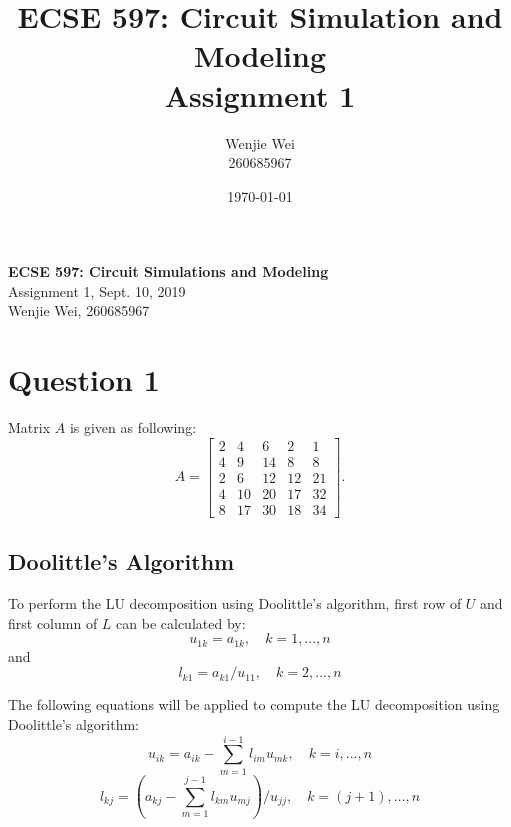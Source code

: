 \documentclass[a4paper,titlepage]{article}
\title{\textbf{ECSE 597: Circuit Simulation and Modeling} \\ Assignment 1}
\author{Wenjie Wei \\ 260685967}
\date{\today}
\begin{document}
	\sloppy	
	
	\begin{center}
		{\LARGE \bf ECSE 597: Circuit Simulations and Modeling}\\
		{\large Assignment 1, Sept. 10, 2019}\\
		{Wenjie Wei, 260685967}
	\end{center}
	
	\section{Question 1}
		Matrix $A$ is given as following:
		$$
			A = \begin{bmatrix}
				2 & 4 & 6 & 2 & 1\\
				4 & 9 & 14 & 8 & 8\\
				2 & 6 & 12 & 12 & 21\\
				4 & 10 & 20 & 17 & 32\\
				8 & 17 & 30 & 18 & 34
			\end{bmatrix}.
		$$
	
	\subsection{Doolittle's Algorithm}		
		To perform the LU decomposition using Doolittle's algorithm, first row of $U$ and first column of $L$ can be calculated by:
		\begin{equation}
			u_{1k} = a_{1k}, \quad k = 1, ..., n
			\label{1st_row}
		\end{equation}		
		and
		\begin{equation}
			l_{k1} = a_{k1} / u_{11}, \quad k = 2,...,n
			\label{1st_col}
		\end{equation}
		
		The following equations will be applied to compute the LU decomposition using Doolittle's algorithm:
		\begin{equation}
			u_{ik} = a_{ik} - \sum_{m=1}^{i-1} l_{im}u_{mk}, \quad k = i, ..., n
			\label{rows}
		\end{equation}
		\begin{equation}
			l_{kj} = (a_{kj} - \sum_{m=1}^{j-1} l_{km}u_{mj}) / u_{jj}, \quad k = (j+1), ..., n
			\label{cols}
		\end{equation}
		
\end{document}
